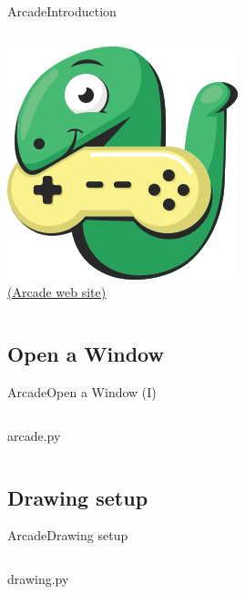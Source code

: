 \documentclass[10pt,compress]{beamer} %
\begin{document}
\begin{frame}{Arcade}{Introduction}
\begin{columns}
            \includegraphics[width=\linewidth]{figs/arcade-logo}\\
    		\href{http://arcade.academy}{(Arcade web site)}
	\end{columns}
\end{frame}

\subsection{Open a Window}
\begin{frame}{Arcade}{Open a Window (I)}
	\begin{columns}
		\vspace{-0.2cm}
		\begin{exampleblock}{arcade.py}
		\vspace{-0.2cm}
		
		\vspace{-0.2cm}
		\end{exampleblock}
	\end{columns}
\end{frame}

\subsection{Drawing setup}
\begin{frame}{Arcade}{Drawing setup}
	\begin{columns}
 	   \column{0.80\textwidth}
		\vspace{-0.2cm}
		\begin{exampleblock}{drawing.py}
		\vspace{-0.2cm}
		
		\vspace{-0.2cm}
		\end{exampleblock}
	\end{columns}
\end{frame}
\end{document}
